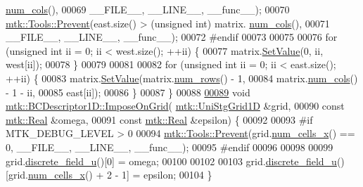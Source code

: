 \begin{DoxyCode}
      \hyperlink{classmtk_1_1DenseMatrix_af6f78373aaf2136f0c78974d7c8de0a8}{num\_cols}(),
00069                       \_\_FILE\_\_, \_\_LINE\_\_, \_\_func\_\_);
00070   \hyperlink{classmtk_1_1Tools_afe5bb096309258e2e72503fd7b41c7e0}{mtk::Tools::Prevent}(east.size() > (\textcolor{keywordtype}{unsigned} int) matrix.
      \hyperlink{classmtk_1_1DenseMatrix_af6f78373aaf2136f0c78974d7c8de0a8}{num\_cols}(),
00071                       \_\_FILE\_\_, \_\_LINE\_\_, \_\_func\_\_);
00072 \textcolor{preprocessor}{  #endif}
00073 
00075 
00076   \textcolor{keywordflow}{for} (\textcolor{keywordtype}{unsigned} \textcolor{keywordtype}{int} ii = 0; ii < west.size(); ++ii) \{
00077     matrix.\hyperlink{classmtk_1_1DenseMatrix_ae0f873a6d3a734da467cafb817da64ae}{SetValue}(0, ii, west[ii]);
00078   \}
00079 
00081 
00082   \textcolor{keywordflow}{for} (\textcolor{keywordtype}{unsigned} \textcolor{keywordtype}{int} ii = 0; ii < east.size(); ++ii) \{
00083     matrix.\hyperlink{classmtk_1_1DenseMatrix_ae0f873a6d3a734da467cafb817da64ae}{SetValue}(matrix.\hyperlink{classmtk_1_1DenseMatrix_a17d8d3b9cc0926044b6972dd190a5c21}{num\_rows}() - 1,
00084                     matrix.\hyperlink{classmtk_1_1DenseMatrix_af6f78373aaf2136f0c78974d7c8de0a8}{num\_cols}() - 1 - ii,
00085                     east[ii]);
00086   \}
00087 \}
00088 
\hypertarget{mtk__bc__descriptor__1d_8cc_source_l00089}{}\hyperlink{classmtk_1_1BCDescriptor1D_adfb101c1a12b452f83dacd207febea0a}{00089} \textcolor{keywordtype}{void} \hyperlink{classmtk_1_1BCDescriptor1D_adfb101c1a12b452f83dacd207febea0a}{mtk::BCDescriptor1D::ImposeOnGrid}(
      \hyperlink{classmtk_1_1UniStgGrid1D}{mtk::UniStgGrid1D} &grid,
00090                                        \textcolor{keyword}{const} \hyperlink{group__c01-roots_gac080bbbf5cbb5502c9f00405f894857d}{mtk::Real} &omega,
00091                                        \textcolor{keyword}{const} \hyperlink{group__c01-roots_gac080bbbf5cbb5502c9f00405f894857d}{mtk::Real} &epsilon) \{
00092 
00093 \textcolor{preprocessor}{  #if MTK\_DEBUG\_LEVEL > 0}
00094   \hyperlink{classmtk_1_1Tools_afe5bb096309258e2e72503fd7b41c7e0}{mtk::Tools::Prevent}(grid.\hyperlink{classmtk_1_1UniStgGrid1D_af1b3729d8afa07be5b2775ed68015b80}{num\_cells\_x}() == 0, \_\_FILE\_\_, \_\_LINE\_\_, \_\_func\_\_);
00095 \textcolor{preprocessor}{  #endif}
00096 
00098 
00099   grid.\hyperlink{classmtk_1_1UniStgGrid1D_acf28d702f6e702599986afcb253bbfc1}{discrete\_field\_u}()[0] = omega;
00100 
00102 
00103   grid.\hyperlink{classmtk_1_1UniStgGrid1D_acf28d702f6e702599986afcb253bbfc1}{discrete\_field\_u}()[grid.\hyperlink{classmtk_1_1UniStgGrid1D_af1b3729d8afa07be5b2775ed68015b80}{num\_cells\_x}() + 2 - 1] = epsilon;
00104 \}
\end{DoxyCode}
